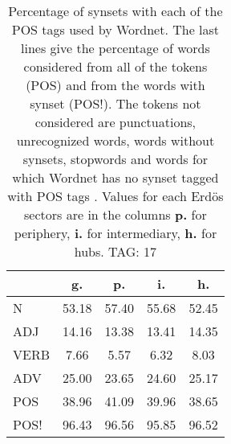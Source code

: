 \begin{table}[h!]
\begin{center}
\begin{tabular}{| l | c | c | c | c |}\hline
 & g. & p. & i. & h. \\\hline
N & 53.18  & 57.40  & 55.68  & 52.45 \\\hline
ADJ & 14.16  & 13.38  & 13.41  & 14.35 \\\hline
VERB & 7.66  & 5.57  & 6.32  & 8.03 \\\hline
ADV & 25.00  & 23.65  & 24.60  & 25.17 \\\hline
POS & 38.96  & 41.09  & 39.96  & 38.65 \\\hline
POS! & 96.43  & 96.56  & 95.85  & 96.52 \\\hline
\end{tabular}
\caption{Percentage of synsets with each of the POS tags used by Wordnet. The last lines give the percentage of words considered from all of the tokens (POS) and from the words with synset (POS!). The tokens not considered are punctuations, unrecognized words, words without synsets, stopwords and words for which Wordnet has no synset  tagged with POS tags . Values for each Erd\"os sectors are in the columns {{\bf p.}} for periphery, {{\bf i.}} for intermediary, {{\bf h.}} for hubs. TAG: 17}
\end{center}
\end{table}